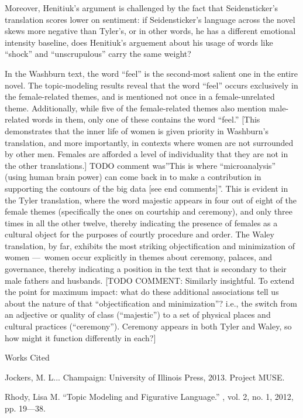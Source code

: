 \documentclass[12pt]{article}
\newcommand{\bibent}{\noindent \hangindent 40pt}
\newenvironment{workscited}{\newpage \begin{center} Works Cited \end{center}}{\newpage }
\begin{document}
\begin{flushleft}
\begin{spacing}{2.0}
Moreover, Henitiuk's argument is challenged by the fact that Seidensticker's translation scores lower on sentiment: if Seidensticker's language across the novel skews more negative than Tyler's, or in other words, he has a different emotional intensity baseline, does Henitiuk's arguement about his usage of words like ``shock'' and ``unscrupulous'' carry the same weight?

In the Washburn text, the word ``feel'' is the second-most salient one in the entire novel. The topic-modeling results reveal that the word ``feel'' occurs exclusively in the female-related themes, and is mentioned not once in a female-unrelated theme. Additionally, while five of the female-related themes also mention male-related words in them, only one of these contains the word ``feel.'' [This demonstrates that the inner life of women is given priority in Washburn's translation, and more importantly, in contexts where women are not surrounded by other men. Females are afforded a level of individuality that they are not in the other translations.] TODO comment was''This is where ``microanalysis'' (using human brain power) can come back in to make a contribution in supporting the contours of the big data [see end comments]''. This is evident in the Tyler translation, where the word majestic appears in four out of eight of the female themes (specifically the ones on courtship and ceremony), and only three times in all the other twelve, thereby indicating the presence of females as a cultural object for the purposes of courtly procedure and order. The Waley translation, by far, exhibits the most striking objectification and minimization of women --- women occur explicitly in themes about ceremony, palaces, and governance, thereby indicating a position in the text that is secondary to their male fathers and husbands. [TODO COMMENT: Similarly insightful. To extend the point for maximum impact: what do these additional associations tell us about the nature of that ``objectification and minimization''? i.e., the switch from an adjective or quality of class (``majestic'') to a set of physical places and cultural practices (``ceremony''). Ceremony appears in both Tyler and Waley, so how might it function differently in each?]

\begin{workscited}

\bibent Jockers, M. L... Champaign: University of Illinois Press, 2013. Project MUSE.

\bibent Rhody, Lisa M. ``Topic Modeling and Figurative Language.'' , vol. 2, no. 1, 2012, pp. 19---38.


\end{workscited}
\end{spacing}
\end{flushleft}
\end{document}
